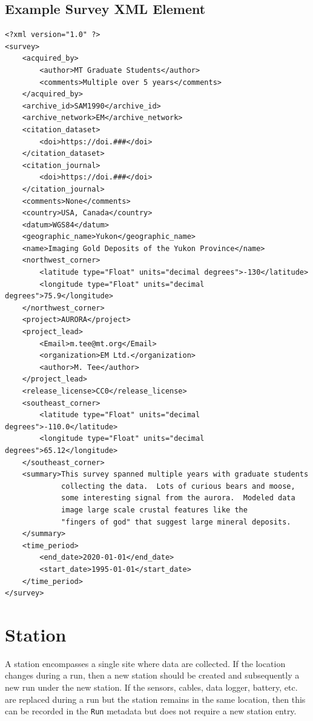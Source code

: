 \documentclass[12pt]{article}
\begin{document}
\clearpage
\newpage
\subsection{Example Survey XML Element}

\begin{verbatim}
<?xml version="1.0" ?>
<survey>
    <acquired_by>
        <author>MT Graduate Students</author>
        <comments>Multiple over 5 years</comments>
    </acquired_by>
    <archive_id>SAM1990</archive_id>
    <archive_network>EM</archive_network>
    <citation_dataset>
        <doi>https://doi.###</doi>
    </citation_dataset>
    <citation_journal>
        <doi>https://doi.###</doi>
    </citation_journal>
    <comments>None</comments>
    <country>USA, Canada</country>
    <datum>WGS84</datum>
    <geographic_name>Yukon</geographic_name>
    <name>Imaging Gold Deposits of the Yukon Province</name>
    <northwest_corner>
        <latitude type="Float" units="decimal degrees">-130</latitude>
        <longitude type="Float" units="decimal degrees">75.9</longitude>
    </northwest_corner>
    <project>AURORA</project>
    <project_lead>
        <Email>m.tee@mt.org</Email>
        <organization>EM Ltd.</organization>
        <author>M. Tee</author>
    </project_lead>
    <release_license>CC0</release_license>
    <southeast_corner>
        <latitude type="Float" units="decimal degrees">-110.0</latitude>
        <longitude type="Float" units="decimal degrees">65.12</longitude>
    </southeast_corner>
    <summary>This survey spanned multiple years with graduate students
             collecting the data.  Lots of curious bears and moose,
             some interesting signal from the aurora.  Modeled data
             image large scale crustal features like the 
             "fingers of god" that suggest large mineral deposits.
    </summary>
    <time_period>
        <end_date>2020-01-01</end_date>
        <start_date>1995-01-01</start_date>
    </time_period>
</survey>
\end{verbatim}

\clearpage
\newpage
\section{Station}

A station encompasses a single site where data are collected. If the location changes during a run, then a new station should be created and subsequently a new run under the new station. If the sensors, cables, data logger, battery, etc. are replaced during a run but the station remains in the same location, then this can be recorded in the \verb|Run| metadata but does not require a new station entry.
\end{document}
